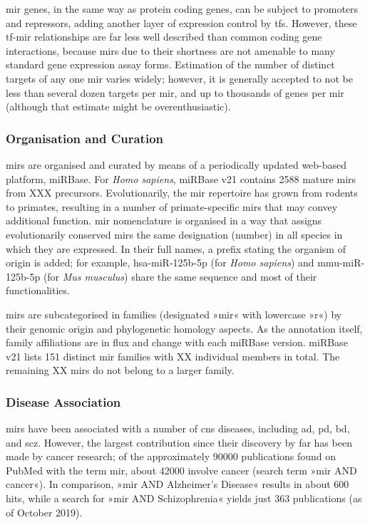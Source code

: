 \ac{mir} genes, in the same way as protein coding genes, can be subject to promoters and repressors, adding another layer of expression control by \acp{tf}. However, these \ac{tf}-\ac{mir} relationships are far less well described than common coding gene interactions, because \acp{mir} due to their shortness are not amenable to many standard gene expression assay forms. Estimation of the number of distinct targets of any one \ac{mir} varies widely; however, it is generally accepted to not be less than several dozen targets per \ac{mir}, and up to thousands of genes per \ac{mir} (although that estimate might be overenthusiastic).

\subsubsection{Organisation and Curation}
\acp{mir} are organised and curated by means of a periodically updated web-based platform, miRBase\cite{Kozomara2019}. For \textit{Homo sapiens}, miRBase v21 contains 2588 mature \acp{mir} from XXX precursors. Evolutionarily, the \ac{mir} repertoire has grown from rodents to primates, resulting in a number of primate-specific \acp{mir} that may convey additional function. \ac{mir} nomenclature is organised\cite{Ambros2003} in a way that assigns evolutionarily conserved \acp{mir} the same designation (number) in all species in which they are expressed. In their full names, a prefix stating the organism of origin is added; for example, hsa-miR-125b-5p (for \textit{Homo sapiens}) and mmu-miR-125b-5p (for \textit{Mus musculus}) share the same sequence and most of their functionalities.

\acp{mir} are subcategorised in families (designated »mir« with lowercase »r«) by their genomic origin and phylogenetic homology aspects. As the annotation itself, family affiliations are in flux and change with each miRBase version. miRBase v21 lists 151 distinct \ac{mir} families with XX individual members in total. The remaining XX \acp{mir} do not belong to a larger family.

\subsubsection{Disease Association}
\acp{mir} have been associated with a number of \ac{cns} diseases, including \ac{ad}, \ac{pd}, \ac{bd}, and \ac{scz}. However, the largest contribution since their discovery by far has been made by cancer research; of the approximately \num{90000} publications found on PubMed with the term \ac{mir}, about \num{42000} involve cancer (search term »\ac{mir} AND cancer«). In comparison, »\ac{mir} AND Alzheimer's Disease« results in about 600 hits, while a search for »\ac{mir} AND Schizophrenia« yields just 363 publications (as of October 2019).

